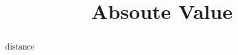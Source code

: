 \documentclass{ximera}
\title{Absoute Value}
\begin{document}
\begin{abstract}
distance
\end{abstract}
\maketitle
\end{document}
